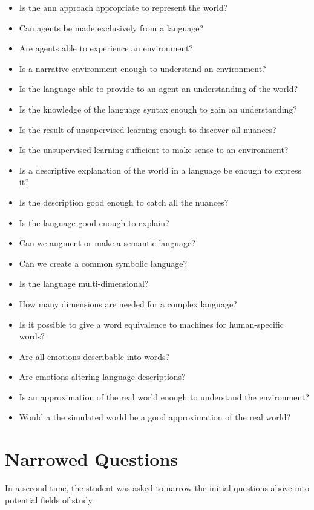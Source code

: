 \begin{itemize}[noitemsep]
    \item Is the \gls{ann} approach appropriate to represent the world?
    \item Can agents be made exclusively from a language?
    \item Are agents able to experience an environment?
    \item Is a narrative environment enough to understand an environment?
    \item Is the language able to provide to an agent an understanding of the world?
    \item Is the knowledge of the language syntax enough to gain an understanding?
    \item Is the result of unsupervised learning enough to discover all nuances?
    \item Is the unsupervised learning sufficient to make sense to an environment?
    \item Is a descriptive explanation of the world in a language be enough to express it?
    \item Is the description good enough to catch all the nuances?
    \item Is the language good enough to explain?
    \item Can we augment or make a semantic language?
    \item Can we create a common symbolic language?
    \item Is the language multi-dimensional?
    \item How many dimensions are needed for a complex language?
    \item Is it possible to give a word equivalence to machines for human-specific words?
    \item Are all emotions describable into words?
    \item Are emotions altering language descriptions?
    \item Is an approximation of the real world enough to understand the environment?
    \item Would a the simulated world be a good approximation of the real world?
\end{itemize}

\section{Narrowed Questions}
In a second time, the student was asked to narrow the initial questions above into potential fields of study.

